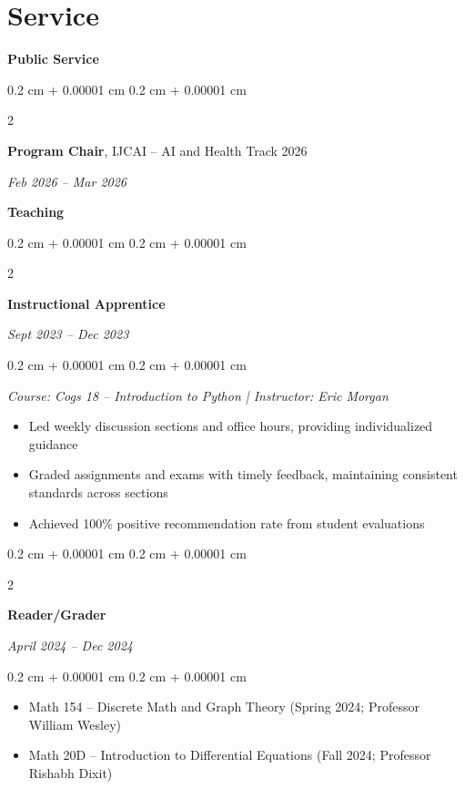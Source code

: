 \documentclass[11pt, letterpaper]{article}
\newenvironment{highlights}{
    \begin{itemize}[
        topsep=0.10 cm,
        parsep=0.10 cm,
        partopsep=0pt,
        itemsep=0pt,
        leftmargin=0.4 cm + 10pt
    ]
}{
    \end{itemize}
} %
\newenvironment{onecolentry}{
    \begin{adjustwidth}{
        0.2 cm + 0.00001 cm
    }{
        0.2 cm + 0.00001 cm
    }
}{
    \end{adjustwidth}
} %
\newenvironment{twocolentry}[2][]{
    \onecolentry
    \def\secondColumn{#2}
    \setcolumnwidth{\fill, 4.5 cm}
    \begin{paracol}{2}
}{
    \switchcolumn \raggedleft \secondColumn
    \end{paracol}
    \endonecolentry
} %
\begin{document}
    \section{Service}

    \textbf{Public Service}
    \vspace{0.1cm}

    \begin{twocolentry}{
    \textit{Feb 2026 -- Mar 2026}}
        \textbf{Program Chair}, IJCAI -- AI and Health Track 2026
    \end{twocolentry}

    \vspace{0.3 cm}

    \textbf{Teaching}
    \vspace{0.1cm}

    \begin{samepage}
    \begin{twocolentry}{
    \textit{Sept 2023 -- Dec 2023}}
        \textbf{Instructional Apprentice}

    \end{twocolentry}
        \begin{onecolentry}

        \textit{Course: Cogs 18 -- Introduction to Python | Instructor: Eric Morgan}
            \begin{highlights}
                \item Led weekly discussion sections and office hours, providing individualized guidance
                \item Graded assignments and exams with timely feedback, maintaining consistent standards across sections
                \item Achieved 100\% positive recommendation rate from student evaluations
            \end{highlights}
        \end{onecolentry}

        \vspace{0.2 cm}
        \begin{twocolentry}{
        \textit{April 2024 -- Dec 2024}}
            \textbf{Reader/Grader}

        \end{twocolentry}
        \begin{onecolentry}
            \vspace{0.1cm}
            \begin{highlights}
                \item Math 154 -- Discrete Math and Graph Theory (Spring 2024; Professor William Wesley)
                \item Math 20D -- Introduction to Differential Equations (Fall 2024; Professor Rishabh Dixit)
            \end{highlights}

        \end{onecolentry}
    \end{samepage}
\end{document}
